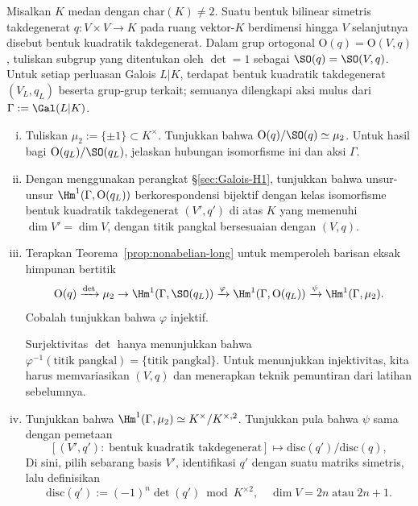 	\item Misalkan $K$ medan dengan $\mathrm{char}(K)\neq2$. Suatu bentuk
	bilinear simetris takdegenerat $q:V\times V\to K$ pada ruang vektor-$K$
	berdimensi hingga $V$ selanjutnya disebut bentuk kuadratik takdegenerat.
	Dalam grup ortogonal $\mathrm{O}(q)=\mathrm{O}(V,q)$, tuliskan subgrup
	yang ditentukan oleh $\det=1$ sebagai
	$\SO(q)=\SO(V,q)$. Untuk setiap perluasan Galois $L|K$, terdapat bentuk
	kuadratik takdegenerat $(V_L,q_L)$ beserta grup-grup terkait;
	semuanya dilengkapi aksi mulus dari $\Gamma:=\Gal(L|K)$.
	\begin{enumerate}[(i)]
		\item Tuliskan $\mu_2:=\{\pm1\}\subset K^\times$. Tunjukkan bahwa
		$\mathrm{O}(q)/\SO(q)\simeq\mu_2$. Untuk hasil bagi
		$\mathrm{O}(q_L)/\SO(q_L)$, jelaskan hubungan isomorfisme ini
		dan aksi $\Gamma$.

		\item Dengan menggunakan perangkat \S\ref{sec:Galois-H1}, tunjukkan
		bahwa unsur-unsur $\Hm^1(\Gamma,\mathrm{O}(q_L))$ berkorespondensi
		bijektif dengan kelas isomorfisme bentuk kuadratik takdegenerat
		$(V',q')$ di atas $K$ yang memenuhi $\dim V'=\dim V$, dengan titik
		pangkal bersesuaian dengan $(V,q)$.

		\item Terapkan Teorema~\ref{prop:nonabelian-long} untuk memperoleh
		barisan eksak himpunan bertitik
		\[ \mathrm{O}(q) \xrightarrow{\det} \mu_2 \to \Hm^1(\Gamma, \SO(q_L)) \xrightarrow{\varphi} \Hm^1(\Gamma, \mathrm{O}(q_L)) \xrightarrow{\psi} \Hm^1(\Gamma, \mu_2). \]
		Cobalah tunjukkan bahwa $\varphi$ injektif.
		\begin{hint}
			Surjektivitas $\det$ hanya menunjukkan bahwa
			$\varphi^{-1}(\text{titik pangkal})=\{\text{titik pangkal}\}$.
			Untuk menunjukkan injektivitas, kita harus memvariasikan $(V,q)$ dan
			menerapkan teknik pemuntiran dari latihan sebelumnya.
		\end{hint}

		\item Tunjukkan bahwa
		$\Hm^1(\Gamma,\mu_2)\simeq K^\times/K^{\times,2}$. Tunjukkan pula bahwa
		$\psi$ sama dengan pemetaan
		\[ \left[ (V', q'):\; \text{bentuk kuadratik takdegenerat} \right] \mapsto \mathrm{disc}(q') / \mathrm{disc}(q), \]
		Di sini, pilih sebarang basis $V'$, identifikasi $q'$ dengan
		suatu matriks simetris, lalu definisikan
		\[ \mathrm{disc}(q') := (-1)^n \det(q') \bmod K^{\times 2}, \quad \dim V = 2n \;\text{atau}\; 2n+1. \]


\end{enumerate}
